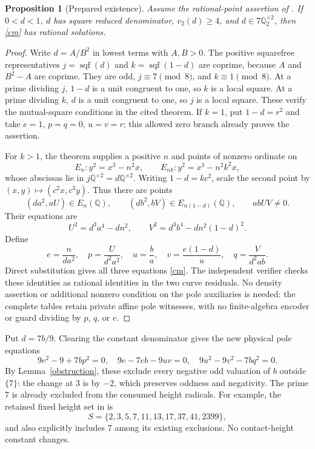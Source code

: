 \documentclass[11pt]{article}
\newtheorem{proposition}[theorem]{Proposition}
\newcommand{\Q}{\mathbb Q}
\DeclareMathOperator{\sqf}{sqf}
\begin{document}
\begin{proposition}[Prepared existence]\label{existence}
Assume the rational-point assertion of \cite[Theorem~2.3]{BB}.
If $0<d<1$, $d$ has square reduced denominator,
$v_2(d)\ge4$, and $d\in7\Q_2^{\times2}$, then \eqref{cm} has
rational solutions.
\end{proposition}
\begin{proof}
Write $d=A/B^2$ in lowest terms with $A,B>0$. The positive
squarefree representatives $j=\sqf(d)$ and $k=\sqf(1-d)$ are
coprime, because $A$ and $B^2-A$ are coprime. They are odd,
$j\equiv7\pmod8$, and $k\equiv1\pmod8$. At a prime dividing
$j$, $1-d$ is a unit congruent to one, so $k$ is a local square.
At a prime dividing $k$, $d$ is a unit congruent to one, so $j$
is a local square. These verify the mutual-square conditions in
the cited theorem. If $k=1$, put $1-d=r^2$ and take
$e=1$, $p=q=0$, $u=v=r$; this allowed zero branch already proves
the assertion.

For $k>1$, the theorem supplies a positive $n$ and points of
nonzero ordinate on
\[
 E_n:y^2=x^3-n^2x,\qquad E_{nk}:y^2=x^3-n^2k^2x,
\]
whose abscissas lie in $j\Q^{\times2}=d\Q^{\times2}$.
Writing $1-d=kc^2$, scale the second point by
$(x,y)\mapsto(c^2x,c^3y)$. Thus there are points
\[
 (da^2,aU)\in E_n(\Q),\qquad
 (db^2,bV)\in E_{n(1-d)}(\Q),\qquad abUV\ne0.
\]
Their equations are
\[
 U^2=d^3a^4-dn^2,\qquad
 V^2=d^3b^4-dn^2(1-d)^2.
\]
Define
\begin{equation}\label{pointrecipe}
 e=\frac{n}{da^2},\quad p=\frac{U}{d^2a^2},\quad
 u=\frac ba,\quad v=\frac{e(1-d)}u,\quad
 q=\frac{V}{d^2ab}.
\end{equation}
Direct substitution gives all three equations \eqref{cm}.
The independent verifier checks these identities as rational
identities in the two curve residuals. No density assertion or
additional nonzero condition on the pole auxiliaries is needed:
the complete tables retain private affine pole witnesses, with no
finite-algebra encoder or guard dividing by $p$, $q$, or $e$.
\end{proof}

Put $d=7b/9$. Clearing the constant denominator gives the new
physical pole equations
\begin{equation}\label{newphysical}
 9e^2-9+7bp^2=0,\quad
 9e-7eb-9uv=0,\quad
 9u^2-9v^2-7bq^2=0.
\end{equation}
By Lemma~\ref{obstruction}, these exclude every negative odd
valuation of $b$ outside $\{7\}$: the change at $3$ is by $-2$,
which preserves oddness and negativity. The prime $7$ is already
excluded from the consumed height radicals. For example, the
retained fixed height set in \cite[Section~5]{v62} is
\[
 S=\{2,3,5,7,11,13,17,37,41,2399\},
\]
and \cite[Section~5]{v82} also explicitly includes $7$ among its
existing exclusions. No contact-height constant changes.
\end{document}
